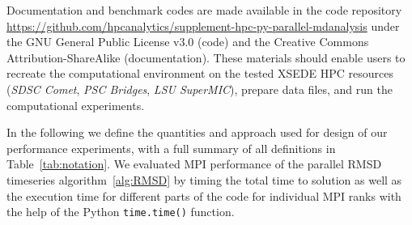 \label{sec:methods}

Documentation and benchmark codes are made available in the code repository \url{https://github.com/hpcanalytics/supplement-hpc-py-parallel-mdanalysis} under the GNU General Public License v3.0 (code) and the Creative Commons Attribution-ShareAlike (documentation). 
These materials should enable users to recreate the computational environment on the tested XSEDE HPC resources (\emph{SDSC Comet}, \emph{PSC Bridges}, \emph{LSU SuperMIC}), prepare data files, and run the computational experiments.

In the following we define the quantities and approach used for design of our performance experiments, with a full summary of all definitions in Table~\ref{tab:notation}.
We evaluated MPI performance of the parallel RMSD timeseries algorithm~\ref{alg:RMSD} by timing the total time to solution as well as the execution time for different parts of the code for individual MPI ranks with the help of the Python \texttt{time.time()} function.


